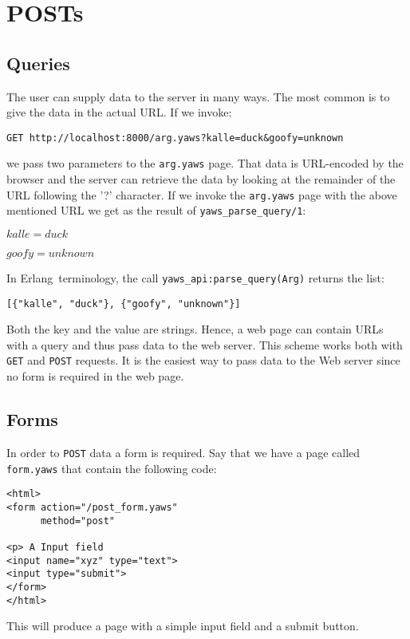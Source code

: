 \documentclass[11pt,oneside,english]{book}
\newcommand{\Erlang}            %
        {{\sc Erlang}}
\begin{document}
\section{POSTs}

\subsection{Queries}

The user can supply data to the server in many ways. The most
common is to give the data in the actual URL.
If we invoke:

\verb+GET http://localhost:8000/arg.yaws?kalle=duck&goofy=unknown+

we pass two parameters to the \verb+arg.yaws+ page.  That data is
URL-encoded by the browser and the server can retrieve the data by
looking at the remainder of the URL following the '?' character.  If
we invoke the \verb+arg.yaws+ page with the above mentioned URL we get
as the result of \verb+yaws_parse_query/1+:

$kalle = duck$

$goofy = unknown$

In \Erlang\  terminology, the call \verb+yaws_api:parse_query(Arg)+ returns
the list:
\begin{verbatim}
[{"kalle", "duck"}, {"goofy", "unknown"}]
\end{verbatim}

Both the key and the value are strings.
Hence, a web page can contain URLs with a
query and thus pass data to the web server. This scheme works both
with \verb+GET+ and \verb+POST+ requests.  It is the easiest way to
pass data to the Web server since no form is required in the web page.


\subsection{Forms}

In order to \verb+POST+ data a form is required. Say that we have a
page called \verb+form.yaws+ that contain the following code:

\begin{verbatim}
<html>
<form action="/post_form.yaws"
      method="post"

<p> A Input field
<input name="xyz" type="text">
<input type="submit">
</form>
</html>
\end{verbatim}

This will produce a page with a simple input field and a submit button.
\end{document}
